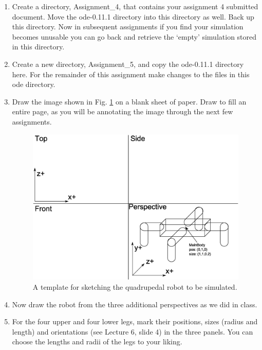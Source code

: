\documentclass[12pt]{article}
\begin{document}
\begin{enumerate}

\item Create a directory, Assignment\_4, that contains your assignment 4 submitted document. Move the ode-0.11.1 directory into this directory as well. Back up this directory. Now in subsequent assignments if you find your simulation becomes unusable you can go back and retrieve the `empty' simulation stored in this directory.

\item Create a new directory, Assignment\_5, and copy the ode-0.11.1 directory here. For the remainder of this assignment make changes to the files in this ode directory.

\item Draw the image shown in Fig. \ref{Fig1} on a blank sheet of paper. Draw to fill an entire page, as you will be annotating the image through the next few assignments.

\begin{figure}[!t]
\centerline{
\includegraphics[width=1.0\textwidth]{Robot_Schematic.eps}
}
\caption{A template for sketching the quadrupedal robot to be simulated.}
\label{Fig1}
\end{figure}

\item Now draw the robot from the three additional perspectives as we did in class.

\item For the four upper and four lower legs, mark their positions, sizes (radius and length) and orientations (see Lecture 6, slide 4) in the three panels. You can choose the lengths and radii of the legs to your liking.


\end{enumerate}
\end{document}

